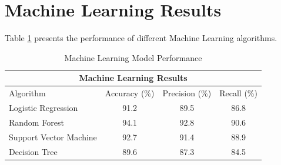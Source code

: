 \documentclass{article}
\begin{document}
	\section{Machine Learning Results}
	
	Table \ref{tab:mlresults} presents the performance of different
	Machine Learning algorithms.
	
	\begin{table}[h]
		\centering
		
		\caption{Machine Learning Model Performance}
		\label{tab:mlresults}
		
		\begin{tabular}{lccc}
			\toprule
			
			\multicolumn{4}{c}{\textbf{Machine Learning Results}} \\
			
			\midrule
			
			\rowcolor{blue!20}
			Algorithm & Accuracy (\%) & Precision (\%) & Recall (\%) \\
			
			\midrule
			
			Logistic Regression & 91.2 & 89.5 & 86.8 \\
			
			\rowcolor{gray!15}
			Random Forest & 94.1 & 92.8 & 90.6 \\
			
			Support Vector Machine & 92.7 & 91.4 & 88.9 \\
			
			\rowcolor{gray!15}
			Decision Tree & 89.6 & 87.3 & 84.5 \\
			
			\bottomrule
		\end{tabular}
		
	\end{table}
	
	
	
\end{document}

